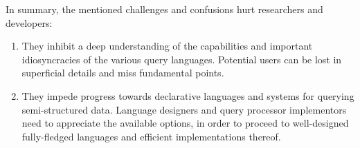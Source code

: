 In summary, the mentioned challenges and confusions hurt researchers and developers:

\begin{enumerate}
\item They inhibit a deep understanding of the capabilities and important idiosyncracies of the various query languages. Potential users can be lost in superficial details and miss fundamental points.
\item They impede progress towards declarative languages and systems for querying semi-structured data. Language designers and query processor implementors need to appreciate the available options, in order to proceed to well-designed fully-fledged languages and efficient implementations thereof. 
\end{enumerate}

